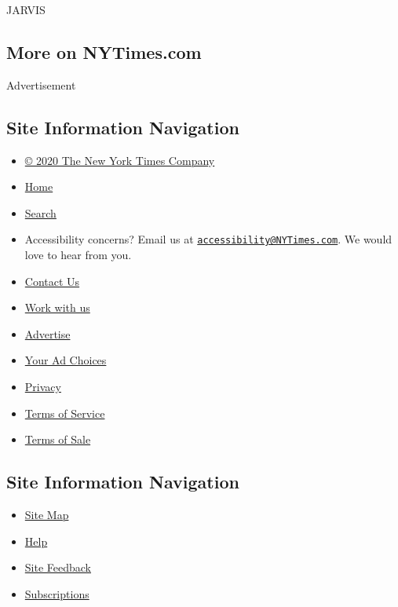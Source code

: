 JARVIS

\hypertarget{more-on-nytimescom}{%
\subsection{More on NYTimes.com}\label{more-on-nytimescom}}

Advertisement

\hypertarget{site-information-navigation}{%
\subsection{Site Information
Navigation}\label{site-information-navigation}}

\begin{itemize}
\tightlist
\item
  \href{https://help.nytimes3xbfgragh.onion/hc/en-us/articles/115014792127-Copyright-notice}{©
  2020 The New York Times Company}
\item
  \href{https://www.nytimes3xbfgragh.onion}{Home}
\item
  \href{https://www.nytimes3xbfgragh.onion/search/}{Search}
\item
  Accessibility concerns? Email us at
  \href{mailto:accessibility@NYTimes.com}{\nolinkurl{accessibility@NYTimes.com}}.
  We would love to hear from you.
\item
  \href{https://help.nytimes3xbfgragh.onion/hc/en-us/articles/115015385887-Contact-Us}{Contact
  Us}
\item
  \href{https://www.nytco.com/careers/}{Work with us}
\item
  \href{https://nytmediakit.com/}{Advertise}
\item
  \href{https://help.nytimes3xbfgragh.onion/hc/en-us/articles/115014892108-Privacy-policy\#pp}{Your
  Ad Choices}
\item
  \href{https://help.nytimes3xbfgragh.onion/hc/en-us/articles/115014892108-Privacy-policy}{Privacy}
\item
  \href{https://help.nytimes3xbfgragh.onion/hc/en-us/articles/115014893428-Terms-of-service}{Terms
  of Service}
\item
  \href{https://help.nytimes3xbfgragh.onion/hc/en-us/articles/115014893968-Terms-of-sale}{Terms
  of Sale}
\end{itemize}

\hypertarget{site-information-navigation-1}{%
\subsection{Site Information
Navigation}\label{site-information-navigation-1}}

\begin{itemize}
\tightlist
\item
  \href{https://spiderbites.nytimes3xbfgragh.onion}{Site Map}
\item
  \href{https://help.nytimes3xbfgragh.onion/hc/en-us}{Help}
\item
  \href{https://help.nytimes3xbfgragh.onion/hc/en-us/articles/115015385887-Contact-Us?redir=myacc}{Site
  Feedback}
\item
  \href{https://www.nytimes3xbfgragh.onion/subscription?campaignId=37WXW}{Subscriptions}
\end{itemize}
